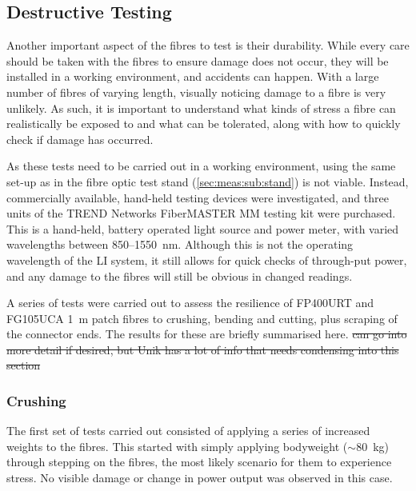\documentclass[a4paper,11pt]{article}
\let\oldsim\sim
\renewcommand{\sim}{{\oldsim}}
\providecommand{\DIFdeltex}[1]{{\protect\color{red}\sout{#1}}}                      %
\providecommand{\DIFdelbegin}{} %
\providecommand{\DIFdelend}{} %
\providecommand{\DIFdel}[1]{\texorpdfstring{\DIFdeltex{#1}}{}} %
\newcommand{\DIFscaledelfig}{0.5}
\newlength{\DIFdelgraphicswidth} %
\newlength{\DIFdelgraphicsheight} %
\newcommand{\DIFdelincludegraphics}[2][]{%
\sbox{\DIFdelgraphicsbox}{\DIFOincludegraphics[#1]{#2}}%
\settoboxwidth{\DIFdelgraphicswidth}{\DIFdelgraphicsbox} %
\settoboxtotalheight{\DIFdelgraphicsheight}{\DIFdelgraphicsbox} %
\scalebox{\DIFscaledelfig}{%
\parbox[b]{\DIFdelgraphicswidth}{\usebox{\DIFdelgraphicsbox}\\[-\baselineskip] \rule{\DIFdelgraphicswidth}{0em}}\llap{\resizebox{\DIFdelgraphicswidth}{\DIFdelgraphicsheight}{%
\setlength{\unitlength}{\DIFdelgraphicswidth}%
\begin{picture}(1,1)%
\thicklines\linethickness{2pt} %
{\color[rgb]{1,0,0}\put(0,0){\framebox(1,1){}}}%
{\color[rgb]{1,0,0}\put(0,0){\line( 1,1){1}}}%
{\color[rgb]{1,0,0}\put(0,1){\line(1,-1){1}}}%
\end{picture}%
}\hspace*{3pt}}} %
} %
\DeclareRobustCommand{\DIFdelbegin}{\DIFOdelbegin \let\includegraphics\DIFdelincludegraphics} %
\DeclareRobustCommand{\DIFdelend}{\DIFOaddend \let\includegraphics\DIFOincludegraphics} %
\begin{document}
\subsection{Destructive Testing}\label{sec:tests:sub:destruction}
Another important aspect of the fibres to test is their durability. While every care should be taken with the fibres to ensure damage does not occur, they will be installed in a working environment, and accidents can happen.  With a large number of fibres of varying length, visually noticing damage to a fibre is very unlikely. As such, it is important to understand what kinds of stress a fibre can realistically be exposed to and what can be tolerated, along with how to quickly check if damage has occurred.

As these tests need to be carried out in a working environment, using the same set-up as in the fibre optic test stand (\cref{sec:meas:sub:stand}) is not viable. Instead, commercially available, hand-held testing devices were investigated, and three units of the TREND Networks FiberMASTER MM testing kit \cite{bib:TREND} were purchased. This is a hand-held, battery operated light source and power meter, with varied wavelengths between 850--1550~nm. Although this is not the operating wavelength of the LI system, it still allows for quick checks of through-put power, and any damage to the fibres will still be obvious in changed readings.

A series of tests were carried out to assess the resilience of FP400URT and FG105UCA 1~m patch fibres to crushing, bending and cutting, plus scraping of the connector ends. The results for these are briefly summarised here.
\DIFdelbegin %
\DIFdel{can go into more detail if desired, but Unik has a lot of info that needs condensing into this section}%
\DIFdelend 

\subsubsection{Crushing}
The first set of tests carried out consisted of applying a series of increased weights to the fibres. This started with simply applying bodyweight ($\sim80$~kg) through stepping on the fibres, the most likely scenario for them to experience stress. No visible damage or change in power output was observed in this case.
\end{document}
